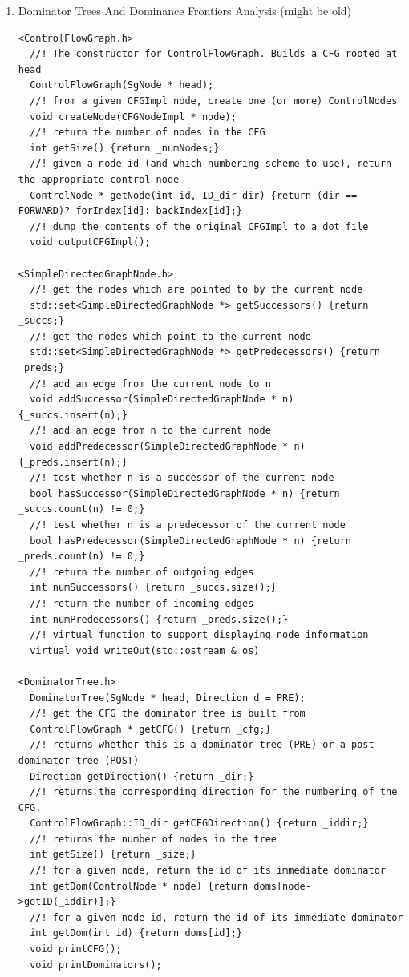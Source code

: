 \begin{enumerate}
\begin{enumerate}
\begin{lstlisting}
      \end{lstlisting}

      \item Dominator Trees And Dominance Frontiers Analysis (might be old)
      \begin{lstlisting}
<ControlFlowGraph.h>
  //! The constructor for ControlFlowGraph. Builds a CFG rooted at head
  ControlFlowGraph(SgNode * head);
  //! from a given CFGImpl node, create one (or more) ControlNodes
  void createNode(CFGNodeImpl * node);
  //! return the number of nodes in the CFG
  int getSize() {return _numNodes;}
  //! given a node id (and which numbering scheme to use), return the appropriate control node
  ControlNode * getNode(int id, ID_dir dir) {return (dir == FORWARD)?_forIndex[id]:_backIndex[id];}
  //! dump the contents of the original CFGImpl to a dot file
  void outputCFGImpl();

<SimpleDirectedGraphNode.h>
  //! get the nodes which are pointed to by the current node
  std::set<SimpleDirectedGraphNode *> getSuccessors() {return _succs;}
  //! get the nodes which point to the current node
  std::set<SimpleDirectedGraphNode *> getPredecessors() {return _preds;}
  //! add an edge from the current node to n
  void addSuccessor(SimpleDirectedGraphNode * n) {_succs.insert(n);}
  //! add an edge from n to the current node
  void addPredecessor(SimpleDirectedGraphNode * n) {_preds.insert(n);}
  //! test whether n is a successor of the current node
  bool hasSuccessor(SimpleDirectedGraphNode * n) {return _succs.count(n) != 0;}
  //! test whether n is a predecessor of the current node
  bool hasPredecessor(SimpleDirectedGraphNode * n) {return _preds.count(n) != 0;}
  //! return the number of outgoing edges
  int numSuccessors() {return _succs.size();}
  //! return the number of incoming edges
  int numPredecessors() {return _preds.size();}
  //! virtual function to support displaying node information
  virtual void writeOut(std::ostream & os)

<DominatorTree.h>
  DominatorTree(SgNode * head, Direction d = PRE);
  //! get the CFG the dominator tree is built from
  ControlFlowGraph * getCFG() {return _cfg;}
  //! returns whether this is a dominator tree (PRE) or a post-dominator tree (POST)
  Direction getDirection() {return _dir;}
  //! returns the corresponding direction for the numbering of the CFG.
  ControlFlowGraph::ID_dir getCFGDirection() {return _iddir;}
  //! returns the number of nodes in the tree
  int getSize() {return _size;}
  //! for a given node, return the id of its immediate dominator
  int getDom(ControlNode * node) {return doms[node->getID(_iddir)];}
  //! for a given node id, return the id of its immediate dominator
  int getDom(int id) {return doms[id];}
  void printCFG();
  void printDominators();


\end{lstlisting}
\end{enumerate}
\end{enumerate}
